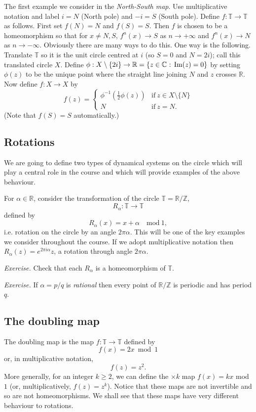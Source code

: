 \documentclass[12pt]{article}
\theoremstyle{definition}
\theoremstyle{remark}
\begin{document}
The first example we consider in the {\it North-South map}. Use multiplicative notation and label $i=N$
(North pole) and $-i=S$ (South pole). Define $f : \mathbb T \to \mathbb T$ as follows.
First set $f(N)=N$ and $f(S)=S$. Then $f$ is chosen to be a homeomorphism 
so that for $x \ne N,S$, $f^n(x) \to S$ as
$n \to +\infty$ and $f^{n}(x) \to N$ as $n \to -\infty$. Obviously there are many ways to do this. One way
is the following. Translate $\mathbb T$ so it is the unit circle centred at $i$ (so $S=0$ and $N=2i$);
call this translated circle $X$.
Define $\phi : X\setminus \{2i\} \to \mathbb R = \{z \in \mathbb C \hbox{ : } \mathrm{Im}(z)=0\}$
by setting $\phi(z)$ to be the unique point where the straight line joining $N$ and $z$ crosses $\mathbb R$.
Now define $f : X \to X$ by
\[
f(z) = \begin{cases}\phi^{-1}(\frac{1}{2}\phi(z)) & \text{if} \ z \in X\setminus\{N\} \\
N & \text{if} \ z=N.
\end{cases}
\]
(Note that $f(S)=S$ automatically.)

\subsection{Rotations}

We are going to define two types of dynamical systems on the circle which will play a central role in the course and which will provide examples of the above behaviour.

For $\alpha \in \mathbb R$,
consider the transformation of the circle $\mathbb T = \mathbb R/\mathbb Z$,
\[
R_\alpha : \mathbb T \to\mathbb T
\] 
defined by
\[
R_\alpha(x) = x + \alpha \quad \text{mod} \ 1,
\]
i.e. rotation on the circle by an angle $2\pi \alpha$.
This will be one of the key examples we consider throughout the course.
If we adopt multiplicative notation then
$R_\alpha(z) =e^{2\pi i\alpha}z$, a rotation through angle $2\pi \alpha$.

\medskip
\noindent
{\it Exercise.}
Check that each $R_\alpha$ is a homeomorphism of $\mathbb T$.


\medskip
\noindent
{\it Exercise.}
If $\alpha = p/q$ is {\it rational} then every point of $\mathbb R/\mathbb Z$ is periodic and has period
$q$.



\subsection{The doubling map}
The doubling map is the map $f : \mathbb T \to \mathbb T$ defined by
\[
 f(x) = 2x \bmod 1
\]
or, in multiplicative notation, 
\[  
 f(z) = z^2.
\]
More generally, for an integer $k \ge 2$, we can define the $\times k$ map
$f(x) = kx$ mod $1$ (or, multiplicatively, $f(z)=z^k$).
Notice that these maps are not invertible and so are not homeomorphisms.
We shall see that these maps have very different behaviour to rotations.
\end{document}
